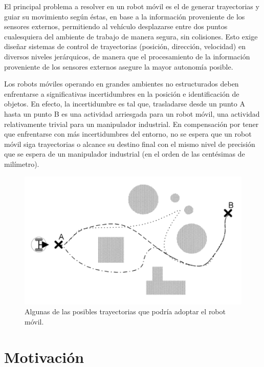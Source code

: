 El principal problema a resolver en un robot móvil es el de generar trayectorias y guiar su movimiento según éstas, en base a la información proveniente de los sensores externos, permitiendo al vehículo desplazarse entre dos puntos cualesquiera del ambiente de trabajo de manera segura, sin colisiones. Esto exige diseñar sistemas de control de trayectorias (posición, dirección, velocidad) en diversos niveles jerárquicos, de manera que el procesamiento de la información proveniente de los sensores externos asegure la mayor autonomía posible.

Los robots móviles operando en grandes ambientes no estructurados deben enfrentarse a significativas incertidumbres en la posición e identificación de objetos. En efecto, la incertidumbre es tal que, trasladarse desde un punto A hasta un punto B es una actividad arriesgada para un robot móvil, una actividad relativamente trivial para un manipulador industrial. En compensación por tener que enfrentarse con más incertidumbres del entorno, no se espera que un robot móvil siga trayectorias o alcance su destino final con el mismo nivel de precisión que se espera de un manipulador industrial (en el orden de las centésimas de milímetro).

\begin{figure}[ht]
	\centering
	\includegraphics[scale=.5]{./Figures/trayectorias_posibles.png}
	\caption{Algunas de las posibles trayectorias que podría adoptar el robot móvil.}
	\label{fig:trayectoriasPosibles}
\end{figure}


\section{Motivación}


